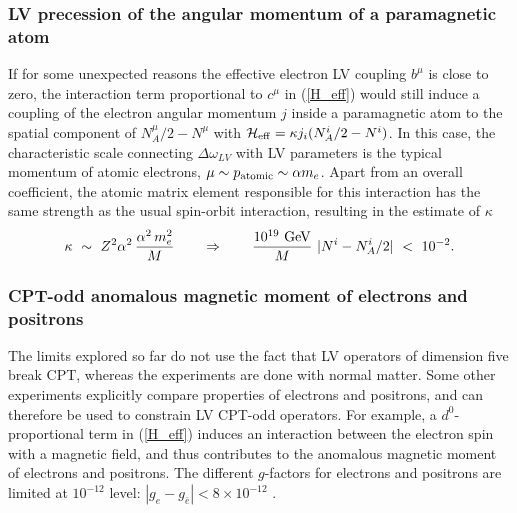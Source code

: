 \documentclass[12pt]{revtex4}
\begin{document}
\subsubsection*{LV precession of the angular momentum of a paramagnetic atom}

If for some unexpected reasons the effective electron LV coupling $b^\mu$ is close to 
zero, the interaction term proportional to $c^\mu$ in (\ref{H_eff}) would still induce
a coupling of the electron angular momentum $j$ inside a paramagnetic
atom to the spatial component of  
$N_A^\mu/2-N^\mu$ with $\mathcal{H}_{\rm eff}= \kappa j_i (N^i_A/2-N^i) $. 
In this case, the characteristic scale connecting 
$\Delta \omega_{LV}$ with LV parameters is the typical momentum 
of atomic electrons, $\mu \sim p_{\rm atomic} \sim \alpha m_e$. 
Apart from an overall coefficient, the atomic matrix element
 responsible for this interaction has the same strength as the usual spin-orbit 
 interaction, resulting in the estimate of $\kappa$
%
 \begin{equation}
 \kappa ~\sim~ Z^2\alpha^2 \, \frac{\alpha^2 \, m_e^2}{M}
\qquad \Rightarrow \qquad
\frac {10^{19}~{\rm GeV}}{M} ~ |N^i-N_A^i/2|~<~10^{-2}.
 \label{N_limit_atom}
 \end{equation}
%


\subsubsection*{CPT-odd anomalous magnetic moment of electrons and positrons}


The limits explored so far do not use the fact that LV operators of
dimension five break CPT, whereas the experiments \cite{clock1,clock2} are
done with normal matter. Some other experiments explicitly compare
properties  of electrons and positrons, and can therefore be used 
to constrain LV CPT-odd operators. For example, a $ d^0 $-proportional
term in (\ref{H_eff}) induces an interaction between the electron spin
with a magnetic field, and thus contributes to the anomalous magnetic
moment of electrons and positrons. The different $g$-factors for
electrons and positrons are limited at $10^{-12}$ level: 
$|g_{e}-g_{\bar e}|< 8\times 10^{-12}$ \cite{Mittleman:1999it}.  
\end{document}
